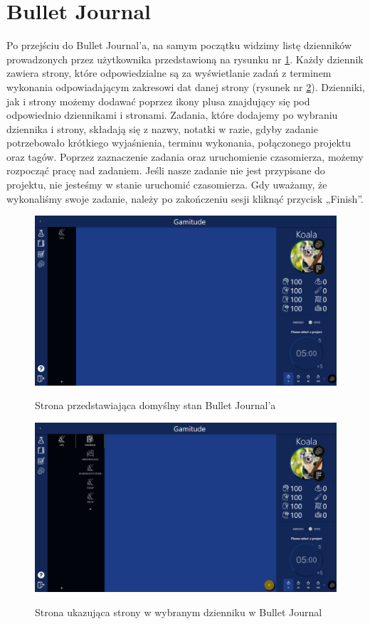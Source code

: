 \documentclass[a4paper,11pt]{report}
\begin{document}
\section{Bullet Journal}
Po przejściu do Bullet Journal’a, na samym początku widzimy listę dzienników prowadzonych przez użytkownika przedstawioną na rysunku nr \ref{fig:Bullet}.
Każdy dziennik zawiera strony, które odpowiedzialne są za wyświetlanie zadań z terminem wykonania odpowiadającym zakresowi dat danej strony (rysunek nr \ref{fig:Bullet_pages}).
Dzienniki, jak i strony możemy dodawać poprzez ikony plusa znajdujący się pod odpowiednio dziennikami i stronami.
Zadania, które dodajemy po wybraniu dziennika i strony, składają się z nazwy, notatki w razie, gdyby zadanie potrzebowało krótkiego wyjaśnienia,
 terminu wykonania, połączonego projektu oraz tagów.
Poprzez zaznaczenie zadania oraz uruchomienie czasomierza, możemy rozpocząć pracę nad zadaniem.
Jeśli nasze zadanie nie jest przypisane do projektu, nie jesteśmy w stanie uruchomić czasomierza.
Gdy uważamy, że wykonaliśmy swoje zadanie, należy po zakończeniu sesji kliknąć przycisk „Finish”.
\begin{figure}[H]
	\centering
	\includegraphics[scale=0.3]{prezentacja/Bullet}\\
	\caption{Strona przedstawiająca domyślny stan Bullet Journal’a}
	\label{fig:Bullet}
\end{figure}
\begin{figure}[H]
	\centering
	\includegraphics[scale=0.3]{prezentacja/Bullet_pages}\\
	\caption{Strona ukazująca strony w wybranym dzienniku w Bullet Journal}
	\label{fig:Bullet_pages}
\end{figure}
\end{document}
